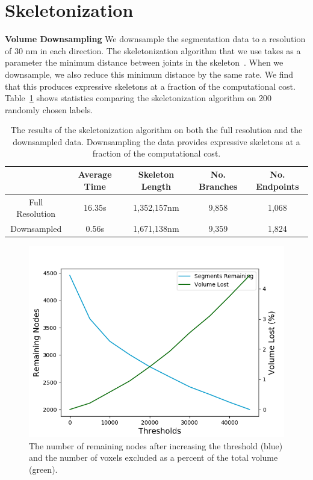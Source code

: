 \section{Skeletonization}

\noindent
\textbf{Volume Downsampling}
We downsample the segmentation data to a resolution of $30$ nm in each direction. 
The skeletonization algorithm that we use takes as a parameter the minimum distance between joints in the skeleton~\cite{zhao2014automatic}.
When we downsample, we also reduce this minimum distance by the same rate.
We find that this produces expressive skeletons at a fraction of the computational cost. 
Table~\ref{table:skeleton} shows statistics comparing the skeletonization algorithm on 200 randomly chosen labels.

\begin{table}
	\scriptsize
	\begin{center}
		\begin{tabular}{c c c c c} \hline
			& \textbf{Average Time} &  \textbf{Skeleton Length} & \textbf{No. Branches} & \textbf{No. Endpoints} \\ \hline
			Full Resolution & 16.35s & 1,352,157nm & 9,858 & 1,068 \\
			Downsampled & 0.56s & 1,671,138nm & 9,359  & 1,824 \\ \hline
		\end{tabular}
	\caption{The results of the skeletonization algorithm on both the full resolution and the downsampled data. Downsampling the data provides expressive skeletons at a fraction of the computational cost.}
	\label{table:skeleton}
	\end{center}
\end{table}

\begin{figure}
	\begin{center}
		\includegraphics[width=0.45\linewidth]{./figures/node-threshold.png}
		\caption{The number of remaining nodes after increasing the threshold (blue) and the number of voxels excluded as a percent of the total volume (green).}
		\label{fig:node-pruning}
	\end{center}
\end{figure}

